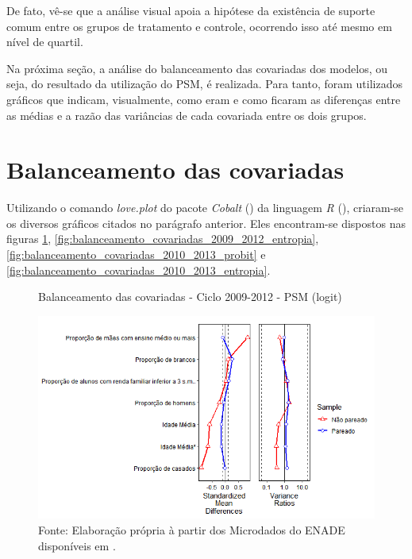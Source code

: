 De fato, vê-se que a análise visual apoia a hipótese da existência de suporte comum entre os grupos de tratamento e controle, ocorrendo isso até mesmo em nível de quartil. 

Na próxima seção, a análise do balanceamento das covariadas dos modelos, ou seja, do resultado da utilização do PSM, é realizada. Para tanto, foram utilizados gráficos que indicam, visualmente, como eram e como ficaram as diferenças entre as médias e a razão das variâncias de cada covariada entre os dois grupos.

\section{Balanceamento das covariadas}

Utilizando o comando \textit{love.plot} do pacote \textit{Cobalt} () da linguagem \textit{R} (), criaram-se os diversos gráficos citados no parágrafo anterior. Eles encontram-se dispostos nas figuras \ref{fig:balanceamento_covariadas_2009_2012_probit}, \ref{fig:balanceamento_covariadas_2009_2012_entropia},\ref{fig:balanceamento_covariadas_2010_2013_probit} e \ref{fig:balanceamento_covariadas_2010_2013_entropia}.

\begin{figure}[H]
	\centering
	\caption{Balanceamento das covariadas - Ciclo 2009-2012 - PSM (logit)}
	\label{fig:balanceamento_covariadas_2009_2012_probit}
	\includegraphics[width=0.7\linewidth]{"Figuras/balanceamento_covariadas_2009_2012_logit.png"}
	\caption*{\RaggedRight Fonte: Elaboração própria à partir dos Microdados do ENADE disponíveis em \cite{INEP2020}.}
\end{figure}

